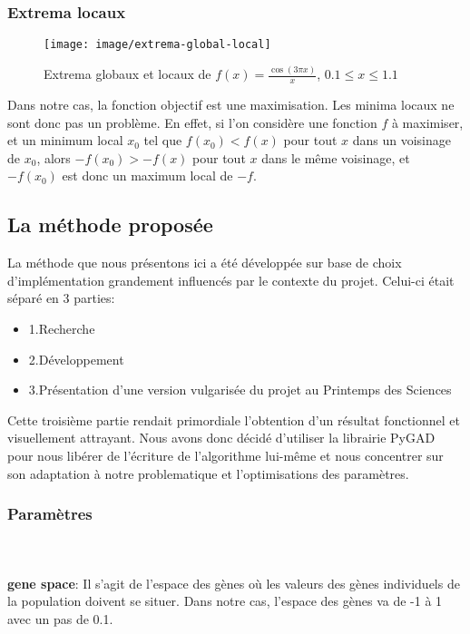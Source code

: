 \documentclass[journal, a4paper]{IEEEtran}
\begin{document}
	\subsubsection{Extrema locaux}\label{subsec:extrema-locaux}
		\begin{figure}
	  \centering
	  \texttt{[image: image/extrema-global-local]}
	  \caption{Extrema globaux et locaux de
		  \(f(x) = \frac{\cos(3\pi x)}{x}\), \quad \(0.1 \leq x \leq 1.1\)
		\cite{extrema-global-local}}
	  \label{fig:extrema-global-local}
	\end{figure}
	Dans notre cas, la fonction objectif est une maximisation.
	Les minima locaux ne sont donc pas un problème.
	En effet, si l'on considère une fonction $f$ à maximiser,
	et un minimum local $x_0$ tel que $f(x_0) < f(x)$ pour tout $x$
	dans un voisinage de $x_0$, alors $-f(x_0) > -f(x)$ pour tout $x$
	dans le même voisinage, et $-f(x_0)$ est donc un maximum local
	de $-f$.

	\subsection{La méthode proposée}\label{subsec:la-methode-proposee}
	La méthode que nous présentons ici a été développée sur base de
	choix d'implémentation grandement influencés par le contexte du
	projet.
	Celui-ci était séparé en 3 parties:
	\begin{itemize}
		\item 1.Recherche
		\item 2.Développement
		\item 3.Présentation d'une version vulgarisée du projet au
		Printemps des Sciences
	\end{itemize}
	Cette troisième partie rendait primordiale l'obtention d'un
	résultat
	fonctionnel et visuellement attrayant.
	Nous avons donc décidé d'utiliser la librairie PyGAD\cite{pygad}
	pour nous libérer de l'écriture de l'algorithme lui-même et nous
	concentrer sur son adaptation à notre problematique et
	l'optimisations des paramètres.

	\subsubsection{Paramètres}
	\newline

	\\
    \\ \textbf{gene space}: Il s'agit de l'espace des gènes où les
	valeurs des gènes individuels de la population doivent se situer.
	Dans notre cas, l'espace des gènes va de -1 à 1 avec un pas de 0.1.
\end{document}
